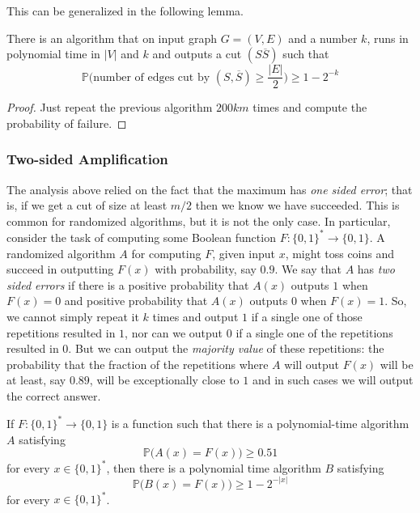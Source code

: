   This can be generalized in the following lemma. 

  \begin{lemma}
  There is an algorithm that on input graph $G = (V, E)$ and a number $k$, runs in polynomial time in $|V|$ and $k$ and outputs a cut $(S \overline{S})$ such that
  \[\mathbb{P}\Big(\text{number of edges cut by } (S, \overline{S}) \geq \frac{|E|}{2} \Big) \geq 1 - 2^{-k}\]
  \end{lemma}
  \begin{proof}
  Just repeat the previous algorithm $200km$ times and compute the probability of failure. 
  \end{proof}

  \subsubsection{Two-sided Amplification}
  The analysis above relied on the fact that the maximum has \textit{one sided error}; that is, if we get a cut of size at least $m/2$ then we know we have succeeded. This is common for randomized algorithms, but it is not the only case. In particular, consider the task of computing some Boolean function $F: \{0,1\}^* \longrightarrow \{0,1\}$. A randomized algorithm $A$ for computing $F$, given input $x$, might toss coins and succeed in outputting $F(x)$ with probability, say $0.9$. We say that $A$ has \textit{two sided errors} if there is a positive probability that $A(x)$ outputs $1$ when $F(x) = 0$ and positive probability that $A(x)$ outputs $0$ when $F(x) = 1$. So, we cannot simply repeat it $k$ times and output $1$ if a single one of those repetitions resulted in $1$, nor can we output $0$ if a single one of the repetitions resulted in $0$. But we can output the \textit{majority value} of these repetitions: the probability that the fraction of the repetitions where $A$ will output $F(x)$ will be at least, say $0.89$, will be exceptionally close to $1$ and in such cases we will output the correct answer. 

  \begin{theorem}
  If $F: \{0,1\}^* \longrightarrow \{0,1\}$ is a function such that there is a polynomial-time algorithm $A$ satisfying 
  \[\mathbb{P} \big( A(x) = F(x) \big) \geq 0.51\]
  for every $x \in \{0,1\}^*$, then there is a polynomial time algorithm $B$ satisfying
  \[\mathbb{P} \big( B(x) = F(x) \big) \geq 1 - 2^{-|x|}\]
  for every $x \in \{0,1\}^*$. 
  \end{theorem}

